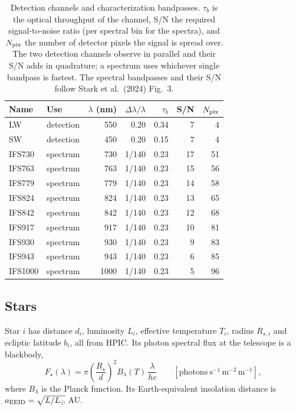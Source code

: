 \documentclass[11pt,a4paper]{article}
\begin{document}
\begin{table}[htbp]
\centering
\small
\begin{tabular}{llrrrrr}
\toprule
\textbf{Name} & \textbf{Use} & $\lambda$ \textbf{(nm)} & $\Delta\lambda/\lambda$ & $\tau_b$ &
\textbf{S/N} & $N_{\rm pix}$ \\
\midrule
LW & detection & 550 & 0.20 & 0.34 & 7 & 4 \\
SW & detection & 450 & 0.20 & 0.15 & 7 & 4 \\
IFS730 & spectrum & 730 & 1/140 & 0.23 & 17 & 51 \\
IFS763 & spectrum & 763 & 1/140 & 0.23 & 15 & 56 \\
IFS779 & spectrum & 779 & 1/140 & 0.23 & 14 & 58 \\
IFS824 & spectrum & 824 & 1/140 & 0.23 & 13 & 65 \\
IFS842 & spectrum & 842 & 1/140 & 0.23 & 12 & 68 \\
IFS917 & spectrum & 917 & 1/140 & 0.23 & 10 & 81 \\
IFS930 & spectrum & 930 & 1/140 & 0.23 & 9 & 83 \\
IFS943 & spectrum & 943 & 1/140 & 0.23 & 6 & 85 \\
IFS1000 & spectrum & 1000 & 1/140 & 0.23 & 5 & 96 \\
\bottomrule
\end{tabular}
\caption{Detection channels and characterization bandpasses. $\tau_b$ is the optical throughput
of the channel, S/N the required signal-to-noise ratio (per spectral bin for the spectra), and
$N_{\rm pix}$ the number of detector pixels the signal is spread over. The two detection channels
observe in parallel and their S/N adds in quadrature; a spectrum uses whichever single bandpass
is fastest. The spectral bandpasses and their S/N follow Stark et al.\ (2024) Fig.~3.}
\label{tab:bands}
\end{table}

\subsection{Stars}

Star $i$ has distance $d_i$, luminosity $L_i$, effective temperature $T_i$, radius $R_{\star,i}$
and ecliptic latitude $b_i$, all from HPIC. Its photon spectral flux at the telescope is a
blackbody,
\begin{equation}
F_\star(\lambda) = \pi\left(\frac{R_\star}{d}\right)^{2} B_\lambda(T)\,\frac{\lambda}{hc}
\qquad [\mathrm{photons\ s^{-1}\,m^{-2}\,m^{-1}}],
\label{eq:starflux}
\end{equation}
where $B_\lambda$ is the Planck function. Its Earth-equivalent insolation distance is
$a_{\rm EEID} = \sqrt{L/L_\odot}$\,AU.
\end{document}
